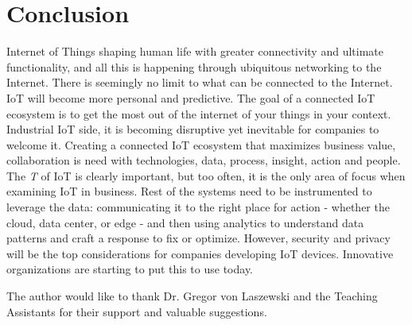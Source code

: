 \documentclass[sigconf]{acmart}
\begin{document}
	
	\section{Conclusion}
	
	Internet of Things shaping human life with greater connectivity and ultimate functionality, and all this is happening through ubiquitous networking to the Internet. There is seemingly no limit to what can be connected to the Internet. IoT will become more personal and predictive. The goal of a connected IoT ecosystem is to get the most out of the internet of your things in your context. Industrial IoT side, it is becoming disruptive yet inevitable for companies to welcome it. Creating a connected IoT ecosystem that maximizes business value, collaboration is need with technologies, data, process, insight, action and people. The {\em T} of IoT is clearly important, but too often, it is the only area of focus when examining IoT in business. Rest of the systems need to be instrumented to leverage the data: communicating it to the right place for action - whether the cloud, data center, or edge - and then using analytics to understand data patterns and craft a response to fix or optimize. However, security and privacy will be the top considerations for companies developing IoT devices. Innovative organizations are starting to put this to use today.
	
	\begin{acks}		
	
		The author would like to thank Dr. Gregor von Laszewski and the Teaching Assistants for their support and valuable suggestions.
		
	\end{acks}

	
	 
	
	
	
	
\end{document}
